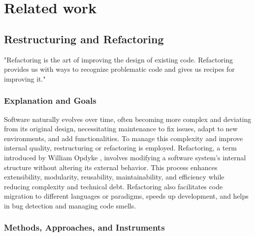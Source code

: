 
%

\chapter{Related work}
\label{cha:Related work}
  
\cite{30yearsSoftwareRefactoring2020}
\cite{estructuringArnold1989}
\cite{SurveyRefactoring2004}
\cite{RefactoringFowler2002Improving}
\cite{wake2004refactoringWorkbook}
\cite{smellsRefactoring2020}
\cite{ManagingMaintenance1983} %

\section{Restructuring and Refactoring}

"Refactoring is the art of improving the design of existing code. Refactoring provides us with ways to recognize problematic code and gives us recipes for improving it."

\subsection{Explanation and Goals}

Software naturally evolves over time, often becoming more complex and deviating from its original design, necessitating maintenance to fix issues, adapt to new environments, and add functionalities. To manage this complexity and improve internal quality, restructuring or refactoring is employed. Refactoring, a term introduced by William Opdyke \cite{articleOpdyke}, involves modifying a software system's internal structure without altering its external behavior. This process enhances extensibility, modularity, reusability, maintainability, and efficiency while reducing complexity and technical debt. Refactoring also facilitates code migration to different languages or paradigms, speeds up development, and helps in bug detection and managing code smells.

\subsection{Methods, Approaches, and Instruments}

